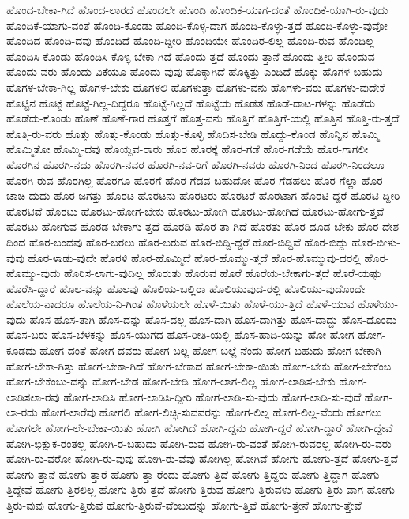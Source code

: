 {ಹೊಂದ-ಬೇಕಾ-ಗಿದೆ
ಹೊಂದ-ಲಾರದೆ
ಹೊಂದಲೇ
ಹೊಂದಿ
ಹೊಂದಿಕೆ-ಯಾಗ-ದಂತೆ
ಹೊಂದಿಕೆ-ಯಾಗಿ-ರು-ವುದು
ಹೊಂದಿಕೆ-ಯಾಗು-ವಂತೆ
ಹೊಂದಿ-ಕೊಂಡು
ಹೊಂದಿ-ಕೊಳ್ಳ-ದಾಗ
ಹೊಂದಿ-ಕೊಳ್ಳು-ತ್ತದೆ
ಹೊಂದಿ-ಕೊಳ್ಳು-ವುವೋ
ಹೊಂದಿದ
ಹೊಂದಿ-ದವು
ಹೊಂದಿದೆ
ಹೊಂದಿ-ದ್ದೀರಿ
ಹೊಂದಿಯೇ
ಹೊಂದಿರ-ಲಿಲ್ಲ
ಹೊಂದಿ-ರುವ
ಹೊಂದಿಲ್ಲ
ಹೊಂದಿಸಿ-ಕೊಂಡು
ಹೊಂದಿಸಿ-ಕೊಳ್ಳ-ಬೇಕಾ-ಗಿದೆ
ಹೊಂದು-ತ್ತದೆ
ಹೊಂದು-ತ್ತಾನೆ
ಹೊಂದು-ತ್ತೀರಿ
ಹೊಂದುವ
ಹೊಂದು-ವರು
ಹೊಂದು-ವಿಕೆಯೂ
ಹೊಂದು-ವುವು
ಹೊಕ್ಕಾಗಿದೆ
ಹೊಕ್ಕಿತ್ತು-ಎಂದಿದೆ
ಹೊಕ್ಕು
ಹೊಗಳ-ಬಹುದು
ಹೊಗಳ-ಬೇಕಾ-ಗಿಲ್ಲ
ಹೊಗಳ-ಬೇಕು
ಹೊಗಳಲಿ
ಹೊಗಳುತ್ತಾ
ಹೊಗಳು-ವನು
ಹೊಗಳು-ವರು
ಹೊಗಳು-ವುದೇಕೆ
ಹೊಟ್ಟಿನ
ಹೊಟ್ಟೆ
ಹೊಟ್ಟೆ-ಗಿಲ್ಲ-ದಿದ್ದರೂ
ಹೊಟ್ಟೆ-ಗಿಲ್ಲದೆ
ಹೊಟ್ಟೆಯ
ಹೊಡೆತ
ಹೊಡೆ-ದಾಟ-ಗಳನ್ನು
ಹೊಡೆದು
ಹೊಡೆದು-ಕೊಂಡು
ಹೊಣೆ
ಹೊಣೆ-ಗಾರ
ಹೊತ್ತಗೆ
ಹೊತ್ತ-ವನು
ಹೊತ್ತಿಗೆ
ಹೊತ್ತಿಗೆ-ಯಲ್ಲಿ
ಹೊತ್ತಿನ
ಹೊತ್ತಿ-ರು-ತ್ತದೆ
ಹೊತ್ತಿ-ರು-ವರು
ಹೊತ್ತು
ಹೊತ್ತು-ಕೊಂಡು
ಹೊತ್ತು-ಕೊಳ್ಳಿ
ಹೊದಿಸ-ಬೇಡಿ
ಹೊದ್ದು-ಕೊಂಡ
ಹೊನ್ನಿನ
ಹೊಮ್ಮಿ
ಹೊಮ್ಮಿತೋ
ಹೊಮ್ಮಿ-ದವು
ಹೊಯ್ದವ-ರಾರು
ಹೊರ
ಹೊರಕ್ಕೆ
ಹೊರ-ಗಡೆ
ಹೊರ-ಗಡೆಯೆ
ಹೊರ-ಗಾಗಲೀ
ಹೊರಗಿನ
ಹೊರಗಿ-ನದು
ಹೊರಗಿ-ನವರ
ಹೊರಗಿ-ನವ-ರಿಗೆ
ಹೊರಗಿ-ನವರು
ಹೊರಗಿ-ನಿಂದ
ಹೊರಗಿ-ನಿಂದಲೂ
ಹೊರಗಿ-ರುವ
ಹೊರಗಿಲ್ಲ
ಹೊರಗೂ
ಹೊರಗೆ
ಹೊರ-ಗೆಡವ-ಬಹುದೋ
ಹೊರ-ಗೆಡಹಲು
ಹೊರ-ಗೆಲ್ಲಾ
ಹೊರ-ಚಾಚಿ-ದುದು
ಹೊರ-ಜಗತ್ತು
ಹೊರಟ
ಹೊರಟನು
ಹೊರಟರು
ಹೊರಟರೆ
ಹೊರಟಾಗ
ಹೊರಟಿ-ದ್ದರೆ
ಹೊರಟಿ-ದ್ದೀರಿ
ಹೊರಟಿವೆ
ಹೊರಟು
ಹೊರಟು-ಹೋಗ-ಬೇಕು
ಹೊರಟು-ಹೋಗಿ
ಹೊರಟು-ಹೋಗಿದೆ
ಹೊರಟು-ಹೋಗು-ತ್ತವೆ
ಹೊರಟು-ಹೋಗುವ
ಹೊರಡ-ಬೇಕಾಗು-ತ್ತದೆ
ಹೊರಡಿ
ಹೊರ-ತಾ-ಗಿದೆ
ಹೊರತು
ಹೊರ-ದೂಡ-ಬೇಕು
ಹೊರ-ದೇಶ-ದಿಂದ
ಹೊರ-ಬಂದವು
ಹೊರ-ಬರಲು
ಹೊರ-ಬರುವ
ಹೊರ-ಬಿದ್ದಿ-ದ್ದರೆ
ಹೊರ-ಬಿದ್ದಿವೆ
ಹೊರ-ಬಿದ್ದು
ಹೊರ-ಬೀಳು-ವುವು
ಹೊರ-ಳಾಡು-ವುದೇ
ಹೊರಳಿ
ಹೊರ-ಹೊಮ್ಮಿದೆ
ಹೊರ-ಹೊಮ್ಮು-ತ್ತದೆ
ಹೊರ-ಹೊಮ್ಮುವು-ದರಲ್ಲಿ
ಹೊರ-ಹೊಮ್ಮು-ವುದು
ಹೊರಿಸ-ಲಾಗು-ವುದಿಲ್ಲ
ಹೊರುತು
ಹೊರುವ
ಹೊರೆ
ಹೊರೆಯ-ಬೇಕಾಗು-ತ್ತದೆ
ಹೊರೆ-ಯಷ್ಟು
ಹೊರೆಸಿ-ದ್ದಾರೆ
ಹೊಲ-ವನ್ನು
ಹೊಲವು
ಹೊಲಿಯ-ಬಲ್ಲಿರಾ
ಹೊಲಿಯುವುದ-ರಲ್ಲಿ
ಹೊಲಿಯು-ವುದೊಂದೇ
ಹೊಲೆಯ-ನಾದರೂ
ಹೊಲೆಯ-ನಿ-ಗಿಂತ
ಹೊಳೆಯಲೇ
ಹೊಳೆ-ಯಿತು
ಹೊಳೆ-ಯು-ತ್ತಿದೆ
ಹೊಳೆ-ಯುವ
ಹೊಳೆಯು-ವುದು
ಹೊಸ
ಹೊಸ-ತಾಗಿ
ಹೊಸ-ದನ್ನು
ಹೊಸ-ದಲ್ಲ
ಹೊಸ-ದಾಗಿ
ಹೊಸ-ದಾಗಿತ್ತು
ಹೊಸ-ದಾದ್ದು
ಹೊಸ-ದೊಂದು
ಹೊಸ-ಬರು
ಹೊಸ-ಬೆಳಕನ್ನು
ಹೊಸ-ಯುಗದ
ಹೊಸ-ರೀತಿ-ಯಲ್ಲಿ
ಹೊಸ-ಹಾದಿ-ಯನ್ನು
ಹೋ
ಹೋಗ
ಹೋಗ-ಕೂಡದು
ಹೋಗ-ದಂತೆ
ಹೋಗ-ದವರು
ಹೋಗ-ಬಲ್ಲ
ಹೋಗ-ಬಲ್ಲೆ-ನೆಂದು
ಹೋಗ-ಬಹುದು
ಹೋಗ-ಬೇಕಾಗಿ
ಹೋಗ-ಬೇಕಾ-ಗಿತ್ತು
ಹೋಗ-ಬೇಕಾ-ಗಿದೆ
ಹೋಗ-ಬೇಕಾದ
ಹೋಗ-ಬೇಕಾ-ಯಿತು
ಹೋಗ-ಬೇಕು
ಹೋಗ-ಬೇಕೆಂಬ
ಹೋಗ-ಬೇಕೆಂಬು-ದನ್ನು
ಹೋಗ-ಬೇಡ
ಹೋಗ-ಬೇಡಿ
ಹೋಗ-ಲಾಗ-ಲಿಲ್ಲ
ಹೋಗ-ಲಾಡಿಸ-ಬೇಕು
ಹೋಗ-ಲಾಡಿಸಲಾ-ರವು
ಹೋಗ-ಲಾಡಿಸಿ
ಹೋಗ-ಲಾಡಿಸಿ-ದ್ದೀರಿ
ಹೋಗ-ಲಾಡಿ-ಸು-ವುದು
ಹೋಗ-ಲಾಡಿ-ಸು-ವುದೆ
ಹೋಗ-ಲಾ-ರದು
ಹೋಗ-ಲಾರೆವು
ಹೋಗಲಿ
ಹೋಗ-ಲಿಚ್ಛಿ-ಸುವವರನ್ನು
ಹೋಗ-ಲಿಲ್ಲ
ಹೋಗ-ಲಿಲ್ಲ-ವೆಂದು
ಹೋಗಲು
ಹೋಗಲೇ
ಹೋಗ-ಲೇ-ಬೇಕಾ-ಯಿತು
ಹೋಗಿ
ಹೋಗಿದೆ
ಹೋಗಿ-ದ್ದನು
ಹೋಗಿ-ದ್ದರೆ
ಹೋಗಿ-ದ್ದಾರೆ
ಹೋಗಿ-ದ್ದೇವೆ
ಹೋಗಿ-ಭಿಕ್ಷುಕ-ರಂತಲ್ಲ
ಹೋಗಿ-ರ-ಬಹುದು
ಹೋಗಿ-ರುವ
ಹೋಗಿ-ರು-ವಂತೆ
ಹೋಗಿ-ರುವರಲ್ಲ
ಹೋಗಿ-ರು-ವರು
ಹೋಗಿ-ರು-ವರೋ
ಹೋಗಿ-ರು-ವುವು
ಹೋಗಿ-ರು-ವೆವು
ಹೋಗಿಲ್ಲ
ಹೋಗಿವೆ
ಹೋಗು
ಹೋಗು-ತ್ತದೆ
ಹೋಗು-ತ್ತವೆ
ಹೋಗು-ತ್ತಾನೆ
ಹೋಗು-ತ್ತಾರೆ
ಹೋಗು-ತ್ತಾ-ರೆಂದು
ಹೋಗು-ತ್ತಿದೆ
ಹೋಗು-ತ್ತಿದ್ದರು
ಹೋಗು-ತ್ತಿದ್ದಾಗ
ಹೋಗು-ತ್ತಿದ್ದೇವೆ
ಹೋಗು-ತ್ತಿರಲಿಲ್ಲ
ಹೋಗು-ತ್ತಿರು-ತ್ತದೆ
ಹೋಗು-ತ್ತಿರುವ
ಹೋಗು-ತ್ತಿರುವಳು
ಹೋಗು-ತ್ತಿರು-ವಾಗ
ಹೋಗು-ತ್ತಿರು-ವುವು
ಹೋಗು-ತ್ತಿರುವೆ
ಹೋಗು-ತ್ತಿರುವೆ-ವೆಂಬುದನ್ನು
ಹೋಗು-ತ್ತಿವೆ
ಹೋಗು-ತ್ತೇನೆ
ಹೋಗು-ತ್ತೇವೆ
}
